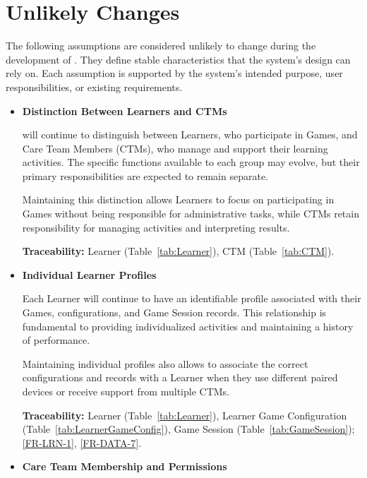 \documentclass[12pt]{article}
\newcounter{lcnum} %
\begin{document}
\section{Unlikely Changes}

The following assumptions are considered unlikely to change during the
development of \progname{}. They define stable characteristics that the system's
design can rely on. Each assumption is supported by the system's intended
purpose, user responsibilities, or existing requirements.

\noindent \begin{itemize}


\item[ULC\refstepcounter{ulcnum}\arabic{ulcnum}
  \label{ULC_Roles}:] \textbf{Distinction Between Learners and CTMs}

\progname{} will continue to distinguish between Learners, who participate in
Games, and Care Team Members (CTMs), who manage and support their learning
activities. The specific functions available to each group may evolve, but their
primary responsibilities are expected to remain separate.

Maintaining this distinction allows Learners to focus on participating in Games
without being responsible for administrative tasks, while CTMs retain
responsibility for managing activities and interpreting results.

\textbf{Traceability:} Learner (Table~\ref{tab:Learner}), CTM
(Table~\ref{tab:CTM}).

\item[ULC\refstepcounter{ulcnum}\arabic{ulcnum}
  \label{ULC_LearnerProfiles}:] \textbf{Individual Learner Profiles}

Each Learner will continue to have an identifiable profile associated with their
Games, configurations, and Game Session records. This relationship is
fundamental to providing individualized activities and maintaining a history of
performance.

Maintaining individual profiles also allows \progname{} to associate the correct
configurations and records with a Learner when they use different paired devices
or receive support from multiple CTMs.

\textbf{Traceability:} Learner (Table~\ref{tab:Learner}), Learner Game
Configuration (Table~\ref{tab:LearnerGameConfig}), Game Session
(Table~\ref{tab:GameSession}); \ref{FR-LRN-1}, \ref{FR-DATA-7}.

\item[ULC\refstepcounter{ulcnum}\arabic{ulcnum}
  \label{ULC_CareTeamPermissions}:] \textbf{Care Team Membership and
Permissions}


\end{itemize}
\end{document}
